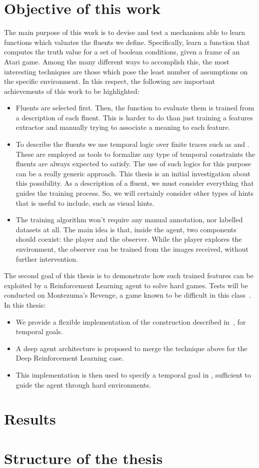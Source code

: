 \section{Objective of this work}

The main purpose of this work is to devise and test a mechanism able to learn
functions which valuates the fluents we define.  Specifically, learn a
function that computes the truth value for a set of boolean conditions, given
a frame of an Atari game. Among the many different ways to accomplish this,
the most interesting techniques are those which pose the least number of
assumptions on the specific environment. In this respect, the following are
important achievements of this work to be highlighted:
\begin{itemize}
	\item Fluents are selected first. Then, the function to evaluate them is
		trained from a description of each fluent. This is harder to do than
		just training a features extractor and manually trying to associate a
		meaning to each feature.
	\item To describe the fluents we use temporal logic over finite traces such
		as \ltl{} and \ldl{}. These are employed as tools to formalize any type of
		temporal constraints the fluents are always expected to satisfy. The use
		of such logics for this purpose can be a really generic approach. This
		thesis is an initial investigation about this possibility. As a
		description of a fluent, we must consider everything that guides the
		training process. So, we will certainly consider other types of hints that
		is useful to include, such as visual hints.
	\item The training algorithm won't require any manual annotation, nor
		labelled datasets at all. The main idea is that, inside the agent, two
		components should coexist: the player and the observer. While the player 
		explores the environment, the observer can be trained from the images
		received, without further intervention.
\end{itemize}

The second goal of this thesis is to demonstrate how such trained features can
be exploited by a Reinforcement Learning agent to solve hard games. Tests will
be conducted on Montezuma's Revenge, a game known to be difficult in this
class~\cite{bib:atari-deepq-nature}. In this thesis:
\begin{itemize}
		\item We provide a flexible implementation of the construction described
			in~\cite{bib:degiacomo-logic-nmrdp}\cite{bib:favorito-thesis}, for
			temporal goals.
		\item A deep agent architecture is proposed to merge the technique above
			for the Deep Reinforcement Learning case.
		\item This implementation is then used to specify a temporal goal in
			\ldl{}, sufficient to guide the agent through hard environments.
\end{itemize}

\section{Results}

\section{Structure of the thesis}

